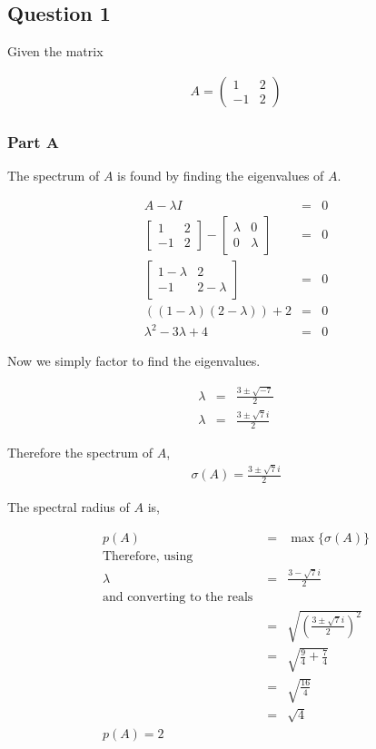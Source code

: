 \subsection{Question 1}
Given the matrix 

\begin{eqnarray}
  A = 
  \begin{pmatrix}
    1 & 2 \\
    -1 & 2
  \end{pmatrix}
\end{eqnarray}

\subsubsection{Part A}

The spectrum of \(A\) is found by finding the eigenvalues of \(A\).

\begin{eqnarray}
  A - \lambda I &=& 0 \\
  \begin{bmatrix}
    1 & 2 \\
    -1 & 2
  \end{bmatrix}
  -
  \begin{bmatrix}
    \lambda & 0 \\
    0 & \lambda
  \end{bmatrix}
  &=& 0 \\
  \begin{bmatrix}
    1-\lambda & 2 \\
    -1 & 2-\lambda
  \end{bmatrix}
  &=& 0 \\
  ((1-\lambda)(2-\lambda)) + 2 &=& 0 \\
  \lambda^{2} - 3\lambda + 4 &=& 0
\end{eqnarray}

Now we simply factor to find the eigenvalues.

\begin{eqnarray}
  \lambda &=& \frac{3 \pm \sqrt{-7}}{2} \\
  \lambda &=& \frac{3 \pm \sqrt{7}i}{2}
\end{eqnarray}

Therefore the spectrum of \(A\), 
\begin{eqnarray}
  \boxed{\sigma(A) = \frac{3 \pm \sqrt{7}i}{2}}
\end{eqnarray}

The spectral radius of \(A\) is,

\begin{eqnarray}
  p(A) &=& \max \{\sigma(A)\} \\
  \text{Therefore, using } \\
  \lambda &=& \frac{3 - \sqrt{7}i}{2} \\
  \text{and converting to the reals } \\
  &=& \sqrt{\left(\frac{3 \pm \sqrt{7}i}{2}\right)^2} \\
  &=& \sqrt{\frac{9}{4} + \frac{7}{4}} \\
  &=& \sqrt{\frac{16}{4}} \\
  &=& \sqrt{4} \\
  \boxed{p(A) = 2}
\end{eqnarray}

